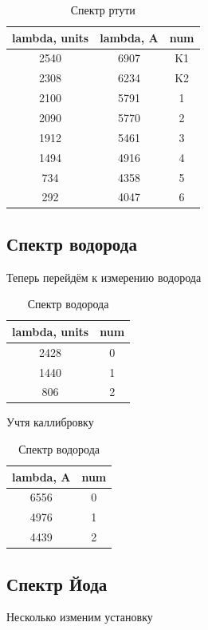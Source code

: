 \documentclass{article}
\begin{document}
\begin{table}[H]
	\centering
\begin{tabular}{|c|c|c|}
	\hline
lambda, units & lambda, A & num \\\hline
2540          & 6907      & K1  \\\hline
2308          & 6234      & K2  \\\hline
2100          & 5791      & 1   \\\hline
2090          & 5770      & 2   \\\hline
1912          & 5461      & 3   \\\hline
1494          & 4916      & 4   \\\hline
734           & 4358      & 5   \\\hline
292           & 4047      & 6   \\\hline
\end{tabular}
	\caption{Спектр ртути}
\end{table}
\subsection{Спектр водорода}
Теперь перейдём к измерению водорода

\begin{table}[H]
	\centering
\begin{tabular}{|c|c|}
	\hline
lambda, units & num \\\hline
2428          & 0   \\\hline
1440          & 1   \\\hline
806           & 2   \\\hline
\end{tabular}
	\caption{Спектр водорода}
\end{table}

Учтя каллибровку

\begin{table}[H]
	\centering
\begin{tabular}{|c|c|}
	\hline
lambda, A & num \\\hline
6556 & 0 \\\hline
4976 & 1 \\\hline
4439 & 2 \\\hline
\end{tabular}
	\caption{Спектр водорода}
\end{table}

\subsection{Спектр Йода}
Несколько изменим установку
\end{document}
